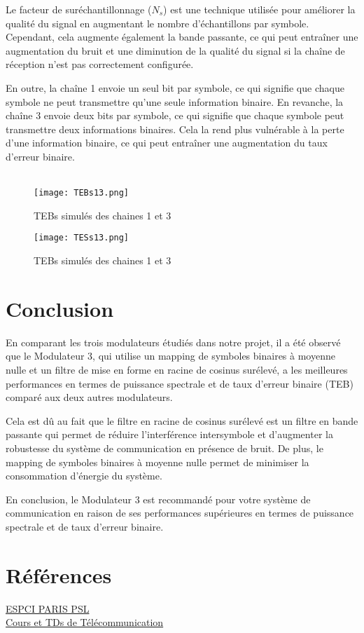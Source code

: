 \documentclass[11pt]{article}
\begin{document}
Le facteur de suréchantillonnage ($N_s$) est une technique utilisée pour améliorer la qualité du signal en augmentant le nombre d'échantillons par symbole. Cependant, cela augmente également la bande passante, ce qui peut entraîner une augmentation du bruit et une diminution de la qualité du signal si la chaîne de réception n'est pas correctement configurée.

En outre, la chaîne 1 envoie un seul bit par symbole, ce qui signifie que chaque symbole ne peut transmettre qu'une seule information binaire. En revanche, la chaîne 3 envoie deux bits par symbole, ce qui signifie que chaque symbole peut transmettre deux informations binaires. Cela la rend plus vulnérable à la perte d'une information binaire, ce qui peut entraîner une augmentation du taux d'erreur binaire.\\\\
\begin{figure}[ht!]
            \centering
            \texttt{[image: TEBs13.png]}
            \caption{TEBs simulés des chaines 1 et 3
            \label{fig : TEBS13}}
\end{figure}

\begin{figure}[ht!]
            \centering
            \texttt{[image: TESs13.png]}
            \caption{TEBs simulés des chaines 1 et 3
            \label{fig : TESS13}}
\end{figure}
\newpage
\section{Conclusion}

En comparant les trois modulateurs étudiés dans notre projet, il a été observé que le Modulateur 3, qui utilise un mapping de symboles binaires à moyenne nulle et un filtre de mise en forme en racine de cosinus surélevé, a les meilleures performances en termes de puissance spectrale et de taux d'erreur binaire (TEB) comparé aux deux autres modulateurs.

Cela est dû au fait que le filtre en racine de cosinus surélevé est un filtre en bande passante qui permet de réduire l'interférence intersymbole et d'augmenter la robustesse du système de communication en présence de bruit. De plus, le mapping de symboles binaires à moyenne nulle permet de minimiser la consommation d'énergie du système.

En conclusion, le Modulateur 3 est recommandé pour votre système de communication en raison de ses performances supérieures en termes de puissance spectrale et de taux d'erreur binaire.

\section{Références}

\href{https://cours.espci.fr/site.php?id=99&fileid=445}{ESPCI PARIS PSL}\\
\href{https://moodle-n7.inp-toulouse.fr/course/view.php?id=2014}{Cours et TDs de Télécommunication}
\end{document}

